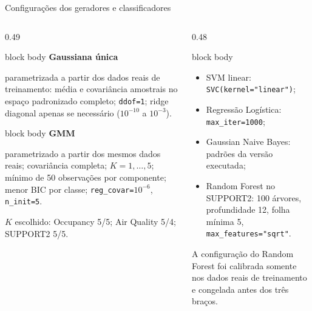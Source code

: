 \begin{frame}{Configurações dos geradores e classificadores}
  \fontsize{9.65}{11.35}\selectfont
  \begin{columns}[T,onlytextwidth]
    \begin{column}{0.49\textwidth}
      \vspace{0.12cm}
      \begin{beamercolorbox}[wd=\linewidth,sep=.14cm,rounded=true]{block body}
        {\bfseries Gaussiana única}\par
        parametrizada a partir dos dados reais de treinamento: média e covariância amostrais no espaço padronizado completo;
        \texttt{ddof=1}; ridge diagonal apenas se necessário ($10^{-10}$ a $10^{-3}$).
      \end{beamercolorbox}
      \vspace{0.12cm}
      \begin{beamercolorbox}[wd=\linewidth,sep=.14cm,rounded=true]{block body}
        {\bfseries GMM}\par
        parametrizado a partir dos mesmos dados reais; covariância completa; $K=1,\ldots,5$; mínimo de 50 observações por componente; menor BIC por classe; \texttt{reg\_covar=$10^{-6}$}, \texttt{n\_init=5}.\par
        {\fontsize{8.3}{9.8}\selectfont $K$ escolhido: Occupancy 5/5; Air Quality 5/4; SUPPORT2 5/5.}
      \end{beamercolorbox}
    \end{column}
    \begin{column}{0.48\textwidth}
      \vspace{0.12cm}
      \begin{beamercolorbox}[wd=\linewidth,sep=.14cm,rounded=true]{block body}
        \fontsize{9.7}{11.5}\selectfont
        \begin{itemize}\setlength{\itemsep}{.04cm}
          \item SVM linear: \texttt{SVC(kernel="linear")};
          \item Regressão Logística: \texttt{max\_iter=1000};
          \item Gaussian Naive Bayes: padrões da versão executada;
          \item Random Forest no SUPPORT2: 100 árvores, profundidade 12, folha mínima 5, \texttt{max\_features="sqrt"}.
        \end{itemize}
      \end{beamercolorbox}
      \vspace{0.10cm}
      {\fontsize{8.7}{10.4}\selectfont
        A configuração do Random Forest foi calibrada somente nos dados reais de treinamento e congelada antes dos três braços.}
    \end{column}
  \end{columns}
\end{frame}

